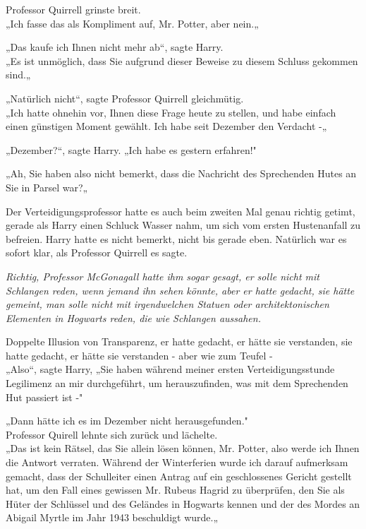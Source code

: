 {Professor Quirrell grinste breit.\\ „Ich fasse das als Kompliment auf, Mr. Potter, aber nein.„

„Das kaufe ich Ihnen nicht mehr ab“, sagte Harry.\\ „Es ist unmöglich, dass Sie aufgrund dieser Beweise zu diesem Schluss gekommen sind.„

„Natürlich nicht“, sagte Professor Quirrell gleichmütig.\\ „Ich hatte ohnehin vor, Ihnen diese Frage heute zu stellen, und habe einfach einen günstigen Moment gewählt. Ich habe seit Dezember den Verdacht -„

„Dezember?“, sagte Harry. „Ich habe es gestern erfahren!"

„Ah, Sie haben also nicht bemerkt, dass die Nachricht des Sprechenden Hutes an Sie in Parsel war?„

Der Verteidigungsprofessor hatte es auch beim zweiten Mal genau richtig getimt, gerade als Harry einen Schluck Wasser nahm, um sich vom ersten Hustenanfall zu befreien. Harry hatte es nicht bemerkt, nicht bis gerade eben. Natürlich war es sofort klar, als Professor Quirrell es sagte.

\emph{Richtig, Professor McGonagall hatte ihm sogar gesagt, er solle nicht mit Schlangen reden, wenn jemand ihn sehen könnte, aber er hatte gedacht, sie hätte gemeint, man solle nicht mit irgendwelchen Statuen oder architektonischen Elementen in Hogwarts reden, die wie Schlangen aussahen.}

Doppelte Illusion von Transparenz, er hatte gedacht, er hätte sie verstanden, sie hatte gedacht, er hätte sie verstanden - aber wie zum Teufel -\\ „Also“, sagte Harry, „Sie haben während meiner ersten Verteidigungsstunde Legilimenz an mir durchgeführt, um herauszufinden, was mit dem Sprechenden Hut passiert ist -"

„Dann hätte ich es im Dezember nicht herausgefunden."\\ Professor Quirell lehnte sich zurück und lächelte.\\ „Das ist kein Rätsel, das Sie allein lösen können, Mr. Potter, also werde ich Ihnen die Antwort verraten. Während der Winterferien wurde ich darauf aufmerksam gemacht, dass der Schulleiter einen Antrag auf ein geschlossenes Gericht gestellt hat, um den Fall eines gewissen Mr. Rubeus Hagrid zu überprüfen, den Sie als Hüter der Schlüssel und des Geländes in Hogwarts kennen und der des Mordes an Abigail Myrtle im Jahr 1943 beschuldigt wurde.„

}
